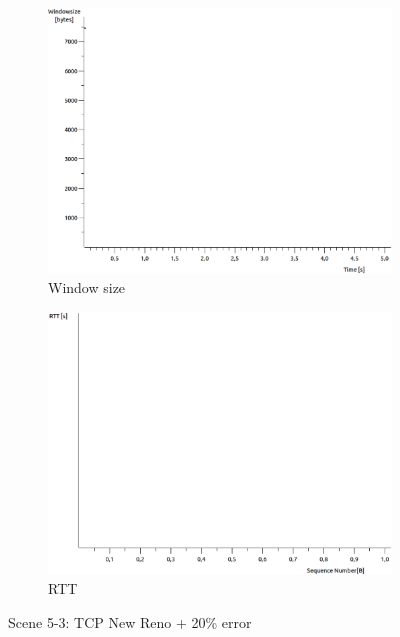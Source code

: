 \documentclass[conference,a4paper]{IEEEtran}
\begin{document}
\begin{figure}
\begin{subfigure}[b]{0.2\textwidth}
  \includegraphics[width=\textwidth]{s5-3_wsize}
  \caption{Window size}
 \end{subfigure}
 \begin{subfigure}[b]{0.2\textwidth}
  \includegraphics[width=\textwidth]{s5-3_rtt}
  \caption{RTT}
 \end{subfigure}
 \caption{Scene 5-3: TCP New Reno + 20\% error}
\end{figure}
\end{document}
